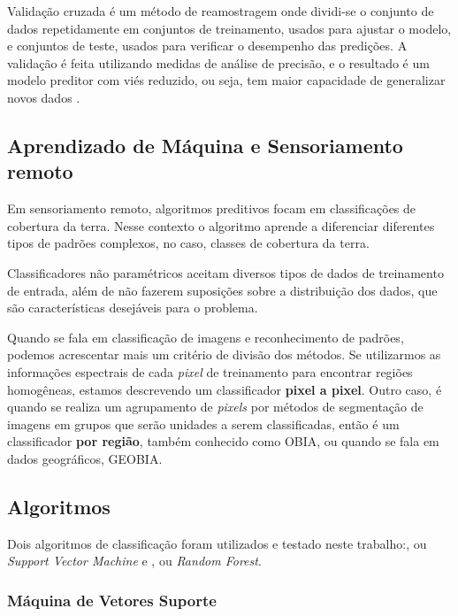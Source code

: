 Validação cruzada é um método de reamostragem onde dividi-se o
conjunto de dados repetidamente em conjuntos de treinamento, usados para
ajustar o modelo, e conjuntos de teste, usados para verificar o
desempenho das predições. A validação é feita utilizando medidas de
análise de precisão, e o resultado é um modelo preditor com viés
reduzido, ou seja, tem maior capacidade de generalizar novos dados
\cite{geocompr,james2013introduction}.

\subsection{Aprendizado de Máquina e Sensoriamento
remoto}\label{aprendizado-de-muxe1quina-e-sensoriamento-remoto}

Em sensoriamento remoto, algoritmos preditivos focam em classificações
de cobertura da terra. Nesse contexto o algoritmo aprende a diferenciar
diferentes tipos de padrões complexos, no caso, classes de cobertura da
terra. \cite{waske2009machine}

Classificadores não paramétricos aceitam diversos tipos de dados de
treinamento de entrada, além de não fazerem suposições sobre a
distribuição dos dados, que são características desejáveis para o
problema. \cite{maxwell}

Quando se fala em classificação de imagens e reconhecimento de
padrões, podemos acrescentar mais um critério de divisão dos métodos. Se utilizarmos as informações espectrais de cada \emph{pixel} de
treinamento para encontrar regiões homogêneas, estamos descrevendo um
classificador \textbf{pixel a pixel}. Outro caso, é quando se realiza um
agrupamento de \emph{pixels} por métodos de segmentação de imagens em
grupos que serão unidades a serem classificadas, então é um
classificador \textbf{por região}, também conhecido como OBIA, ou quando
se fala em dados geográficos, GEOBIA. \cite{meneses2012introduccao,lu-weng}

\subsection{Algoritmos}\label{algoritmos}

Dois algoritmos de classificação foram utilizados e testado neste
trabalho:, ou \emph{Support Vector
Machine} e , ou \emph{Random Forest}.

\subsubsection{Máquina de Vetores
Suporte}\label{muxe1quina-de-vetores-suporte}

